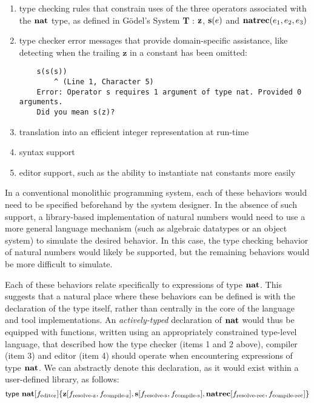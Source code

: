 \begin{enumerate}
\item type checking rules that constrain uses of the three operators associated with the $\textbf{nat}$ type, as defined in G\"{o}del's System \textbf{T} \cite{tapl}: $\textbf{z}$, $\textbf{s}(e)$ and $\textbf{natrec}(e_1, e_2, e_3)$
\item type checker error messages that provide domain-specific assistance, like detecting when the trailing $\textbf{z}$ in a constant has been omitted: 
\begin{verbatim}
    s(s(s))
        ^ (Line 1, Character 5)
    Error: Operator s requires 1 argument of type nat. Provided 0 arguments.
    Did you mean s(z)?
\end{verbatim}
\item translation into an efficient integer representation at run-time
\item syntax support 
\item editor support, such as the ability to instantiate nat constants more easily 
\end{enumerate}

In a conventional monolithic programming system, each of these behaviors would need to be specified beforehand by the system designer. In the absence of such support, a library-based implementation of natural numbers would need to use a more general language mechanism (such as algebraic datatypes or an object system) to simulate the desired behavior. In this case, the type checking behavior of natural numbers would likely be supported, but the remaining behaviors would be more difficult to simulate.

Each of these behaviors relate specifically to expressions of type $\textbf{nat}$. This suggests that a natural place where these behaviors can be defined is with the declaration of the type itself, rather than centrally in the core of the language and tool implementations. An \emph{actively-typed} declaration of $\textbf{nat}$ would thus be equipped with functions, written using an appropriately constrained type-level language, that described how the type checker (items 1 and 2 above), compiler (item 3) and editor (item 4) should operate when encountering expressions of type $\textbf{nat}$. We can abstractly denote this declaration, as it would exist within a user-defined library, as follows:
\begin{equation*}
{\sf type}~\textbf{nat}[f_{\text{editor}}]\{
\textbf{z}[f_{\text{resolve-z}}, f_{\text{compile-z}}], 
\textbf{s}[f_{\text{resolve-s}}, f_{\text{compile-s}}], 
\textbf{natrec}[f_{\text{resolve-rec}}, f_{\text{compile-rec}}]\}
\end{equation*}

